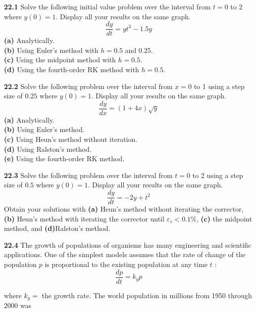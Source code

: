 \begin{multicols}{2}

    \noindent\textbf{22.1} Solve the following initial value problem over the interval from $t=0$ to 2 where $y(0)=1$. Display all your results on the same graph.
    $$
    \frac{d y}{d t}=y t^{3}-1.5 y
    $$
    \textbf{(a)} Analytically.\\
    \textbf{(b)} Using Euler's method with $h=0.5$ and $0.25$.\\
    \textbf{(c)} Using the midpoint method with $h=0.5$.\\
    \textbf{(d)} Using the fourth-order RK method with $h=0.5$.\vspace{2mm}

    \noindent\textbf{22.2} Solve the following problem over the interval from $x=0$ to 1 using a step size of $0.25$ where $y(0)=1$. Display all your results on the same graph.
    $$
    \frac{d y}{d x}=(1+4 x) \sqrt{y}
    $$
    \textbf{(a)} Analytically.\\
    \textbf{(b)} Using Euler's method.\\
    \textbf{(c)} Using Heun's method without iteration.\\
    \textbf{(d)} Using Ralston's method.\\
    \textbf{(e)} Using the fourth-order RK method.\vspace{2mm}

    \noindent\textbf{22.3} Solve the following problem over the interval from $t=0$ to 2 using a step size of $0.5$ where $y(0)=1$. Display all your results on the same graph.
    $$
    \frac{d y}{d t}=-2 y+t^{2}
    $$
    Obtain your solutions with \textbf{(a)} Heun's method without iterating the corrector, \textbf{(b)} Heun's method with iterating the corrector until $\varepsilon_{s}<0.1 \%$, \textbf{(c)} the midpoint method, and \textbf{(d)}Ralston's method.\vspace{2mm}

    \noindent\textbf{22.4} The growth of populations of organisms has many engineering and scientific applications. One of the simplest models assumes that the rate of change of the population $p$ is proportional to the existing population at any time $t$ :
    \begin{equation}
        \tag{P22.4.1}
        \frac{d p}{d t}=k_{g} p
    \end{equation}
    
    \noindent where $k_{g}=$ the growth rate. The world population in millions from 1950 through 2000 was
    

\end{multicols}
